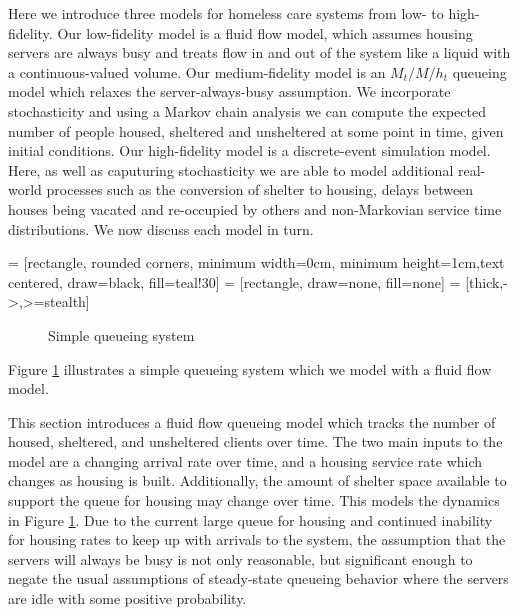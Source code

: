 \documentclass{article}
\begin{document}
Here we introduce three models for homeless care systems from low- to high-fidelity. Our low-fidelity model is a fluid flow model, which assumes housing servers are always busy and treats flow in and out of the system like a liquid with a continuous-valued volume. Our medium-fidelity model is an $M_t/M/h_t$ queueing model which relaxes the server-always-busy assumption. We incorporate stochasticity and using a Markov chain analysis we can compute the expected number of people housed, sheltered and unsheltered at some point in time, given initial conditions. Our high-fidelity model is a discrete-event simulation model. Here, as well as caputuring stochasticity we are able to model additional real-world processes such as the conversion of shelter to housing, delays between houses being vacated and re-occupied by others and non-Markovian service time distributions. We now discuss each model in turn.

 = [rectangle, rounded corners, minimum width=0cm, minimum height=1cm,text centered, draw=black, fill=teal!30]
 = [rectangle, draw=none, fill=none]
 = [thick,->,>=stealth]
\begin{figure} 
  \begin{center}
    \caption{Simple queueing system} \label{fig:simple-q}
  \end{center}
\end{figure}

Figure \ref{fig:simple-q} illustrates a simple queueing system which we model with a fluid flow model.

This section introduces a fluid flow queueing model which tracks the number of housed, sheltered, and unsheltered clients over time.   The two main inputs to the model are a changing arrival rate over time, and a housing service rate which changes as housing is built.  Additionally, the amount of shelter space available to support the queue for housing may change over time.  This models the dynamics in Figure \ref{fig:simple-q}.  Due to the current large queue for housing and continued inability for housing rates to keep up with arrivals to the system, the assumption that the servers will always be busy is not only reasonable, but significant enough to negate the usual assumptions of steady-state queueing behavior where the servers are idle with some positive probability.
\end{document}
